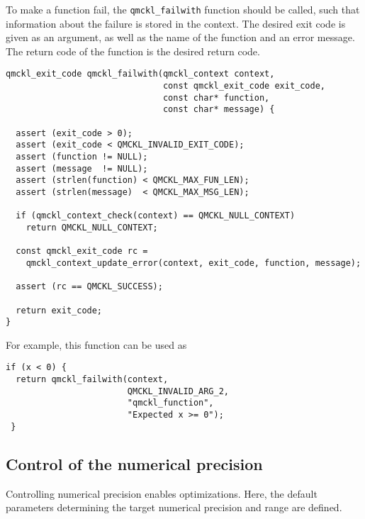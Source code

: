 To make a function fail, the \texttt{qmckl\_failwith} function should be
called, such that information about the failure is stored in
the context. The desired exit code is given as an argument, as
well as the name of the function and an error message. The return
code of the function is the desired return code.

\begin{verbatim}
qmckl_exit_code qmckl_failwith(qmckl_context context,
                               const qmckl_exit_code exit_code,
                               const char* function,
                               const char* message) {

  assert (exit_code > 0);
  assert (exit_code < QMCKL_INVALID_EXIT_CODE);
  assert (function != NULL);
  assert (message  != NULL);
  assert (strlen(function) < QMCKL_MAX_FUN_LEN);
  assert (strlen(message)  < QMCKL_MAX_MSG_LEN);

  if (qmckl_context_check(context) == QMCKL_NULL_CONTEXT)
    return QMCKL_NULL_CONTEXT;
  
  const qmckl_exit_code rc = 
    qmckl_context_update_error(context, exit_code, function, message);

  assert (rc == QMCKL_SUCCESS);

  return exit_code;
}

\end{verbatim}

For example, this function can be used as
\begin{verbatim}
if (x < 0) {
  return qmckl_failwith(context,
                        QMCKL_INVALID_ARG_2,
                        "qmckl_function", 
                        "Expected x >= 0");
 }
\end{verbatim}

\subsection{Control of the numerical precision}
\label{sec:org7e9d10b}

Controlling numerical precision enables optimizations. Here, the                                                             
default parameters determining the target numerical precision and                                                            
range are defined.                                                                                                           

